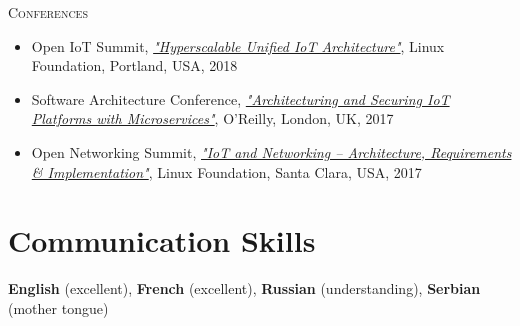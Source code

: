 \documentclass[8pt, a4paper, oneside, final]{scrartcl}
\begin{document}
\begin{minipage}[t]{0.45\linewidth}
    \medskip

    \faGroup \hspace{1mm} \textsc{Conferences}
    \begin{itemize}
      \item Open IoT Summit, \href{http://sched.co/DYM7}{\textit{"Hyperscalable Unified IoT Architecture"}}, Linux Foundation, Portland, USA, 2018
      \item Software Architecture Conference, \href{https://conferences.oreilly.com/software-architecture/sa-eu-2017/public/schedule/detail/62113}
        {\textit{"Architecturing and Securing IoT Platforms with Microservices"}}, O'Reilly, London, UK, 2017
      \item Open Networking Summit, \href{http://sched.co/9x8L}{\textit{"IoT and Networking -- Architecture, Requirements \& Implementation"}}, Linux Foundation, Santa Clara, USA, 2017
    \end{itemize}

    \section{Communication Skills}
      \textbf{English} (excellent), \textbf{French} (excellent), \textbf{Russian} (understanding), \textbf{Serbian} (mother tongue)

\end{minipage}
\end{document}
